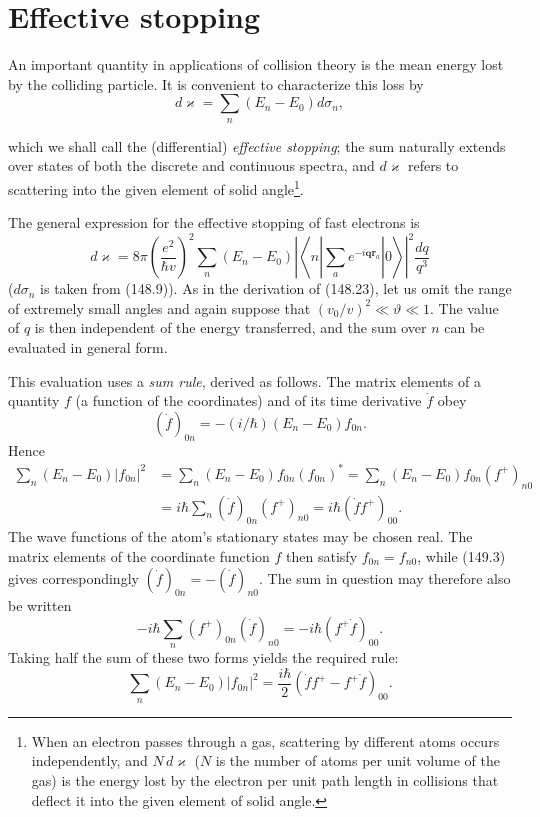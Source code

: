 \section{Effective stopping}

An important quantity in applications of collision theory is the mean energy lost by the colliding particle. It is convenient to characterize this loss by
\begin{equation}
 d\varkappa=\sum_n(E_n-E_0)d\sigma_n,
 \tag{149.1}
\end{equation}

which we shall call the (differential) \emph{effective stopping}; the sum naturally extends over states of both the discrete and continuous spectra, and $d\varkappa$ refers to scattering into the given element of solid angle\footnote{When an electron passes through a gas, scattering by different atoms occurs independently, and $N\,d\varkappa$ ($N$ is the number of atoms per unit volume of the gas) is the energy lost by the electron per unit path length in collisions that deflect it into the given element of solid angle.}.

The general expression for the effective stopping of fast electrons is
\begin{equation}
 d\varkappa=8\pi\left(\frac{e^2}{\hbar v}\right)^2
 \sum_n(E_n-E_0)\left|\left\langle n\left|\sum_a e^{-i\mathbf q\mathbf r_a}\right|0\right\rangle\right|^2
 \frac{dq}{q^3}
 \tag{149.2}
\end{equation}
($d\sigma_n$ is taken from (148.9)). As in the derivation of (148.23), let us omit the range of extremely small angles and again suppose that $(v_0/v)^2\ll\vartheta\ll1$. The value of $q$ is then independent of the energy transferred, and the sum over $n$ can be evaluated in general form.

This evaluation uses a \emph{sum rule}, derived as follows. The matrix elements of a quantity $f$ (a function of the coordinates) and of its time derivative $\dot f$ obey
\begin{equation}
 (\dot f)_{0n}=-(i/\hbar)(E_n-E_0)f_{0n}.
 \tag{149.3}
\end{equation}
Hence
\[
\begin{aligned}
 \sum_n(E_n-E_0)|f_{0n}|^2
 &=\sum_n(E_n-E_0)f_{0n}(f_{0n})^*
 =\sum_n(E_n-E_0)f_{0n}(f^+)_{n0}\\
 &=i\hbar\sum_n(\dot f)_{0n}(f^+)_{n0}=i\hbar(\dot f f^+)_{00}.
\end{aligned}
\]
The wave functions of the atom's stationary states may be chosen real. The matrix elements of the coordinate function $f$ then satisfy $f_{0n}=f_{n0}$, while (149.3) gives correspondingly $(\dot f)_{0n}=-(\dot f)_{n0}$. The sum in question may therefore also be written
\[
 -i\hbar\sum_n(f^+)_{0n}(\dot f)_{n0}=-i\hbar(f^+\dot f)_{00}.
\]
Taking half the sum of these two forms yields the required rule:
\begin{equation}
 \sum_n(E_n-E_0)|f_{0n}|^2=\frac{i\hbar}{2}(\dot f f^+-f^+\dot f)_{00}.
 \tag{149.4}
\end{equation}

